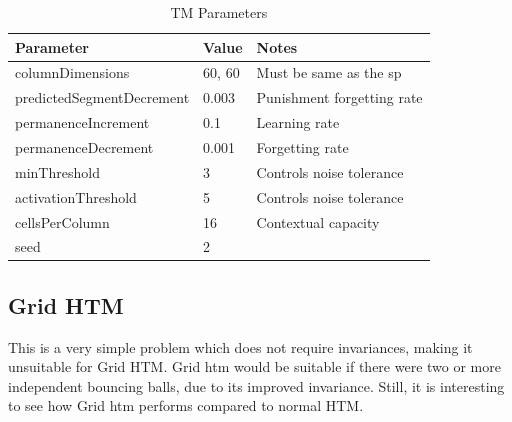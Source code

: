 \begin{table}[H]
    \centering
    \begin{tabularx}{\linewidth}{@{}llX@{}}
        \toprule
        \textbf{Parameter}        & \textbf{Value} & \textbf{Notes}                \\
        \midrule
        columnDimensions          & 60, 60         & Must be same as the \gls*{sp} \\
        predictedSegmentDecrement & 0.003          & Punishment forgetting rate    \\
        permanenceIncrement       & 0.1            & Learning rate                 \\
        permanenceDecrement       & 0.001          & Forgetting rate               \\
        minThreshold              & 3              & Controls noise tolerance      \\
        activationThreshold       & 5              & Controls noise tolerance      \\
        cellsPerColumn            & 16             & Contextual capacity           \\
        seed                      & 2              &                               \\
        \bottomrule
    \end{tabularx}

    \caption{TM Parameters}
    \label{tab:bb_TM_params}
\end{table}
\subsection{Grid HTM}
This is a very simple problem which does not require invariances, making it unsuitable for Grid HTM. Grid \gls*{htm} would be suitable if there were two or more independent bouncing balls, due to its improved invariance. Still, it is interesting to see how Grid \gls*{htm} performs compared to normal HTM.
